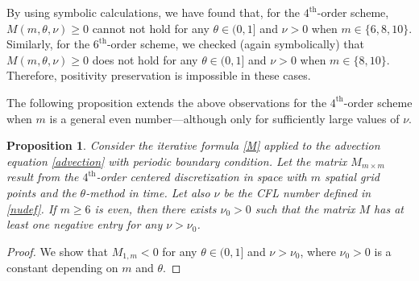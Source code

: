 \documentclass[a4paper]{article}
\newtheorem{proposition}{Proposition}
\begin{document}
\begin{description}[style=unboxed,leftmargin=0cm]
\item [{Case 1:} $m$ is {even}.]
\item \noindent By using symbolic calculations,  we have found that, for the $4^\text{th}$-order scheme, 
$M(m,\theta,\nu)\ge 0$ cannot not hold for any $\theta\in(0,1]$ and $\nu>0$ when $m\in\{6,8,10\}$.
Similarly, for the $6^\text{th}$-order scheme, we checked (again symbolically) that $M(m,\theta,\nu)\ge 0$
does not hold for any $\theta\in(0,1]$ and $\nu>0$ when $m\in\{8,10\}$.
Therefore, positivity preservation is impossible in these cases.

The following proposition extends the above observations for the $4^\text{th}$-order scheme when $m$ is a
general even number---although only for sufficiently large values of $\nu$.
\begin{proposition}\label{m_even_nonpositivityFE}
	Consider the iterative formula \eqref{M} applied to the advection equation \eqref{advection} with periodic
	boundary condition.
	Let the matrix $M_{m \times m}$ result from the $4^\text{th}$-order centered discretization in space with
	$m$ spatial grid points and the $\theta$-method in time.
	Let also $\nu$ be the CFL number defined in \eqref{nudef}.
	If $m \ge 6$ is \emph{even}, then there exists $\nu_0  > 0$ such that the matrix $M$ has at least one
	negative entry for any $\nu > \nu_0$.
\end{proposition}
\begin{proof}
	We show that $M_{1,m} < 0$ for any $\theta \in (0,1]$ and $\nu > \nu_0$,
	where $\nu_0 > 0$ is a constant depending on $m$ and $\theta$.
	

\end{proof}
\end{description}
\end{document}
